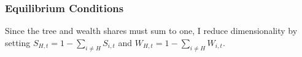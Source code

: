\documentclass[12 pt, oneside]{article}
\theoremstyle{definition}
\theoremstyle{definition}
\theoremstyle{definition}
\newcommand{\E}{\mathbb{E}}
\begin{document}

\subsubsection{Equilibrium Conditions}
Since the tree and wealth shares must sum to one, I reduce dimensionality by setting $S_{H, t} = 1 - \sum_{i\neq H} S_{i, t}$ and $W_{H, t} = 1 - \sum_{i\neq H} W_{i, t}$.
\end{document}
